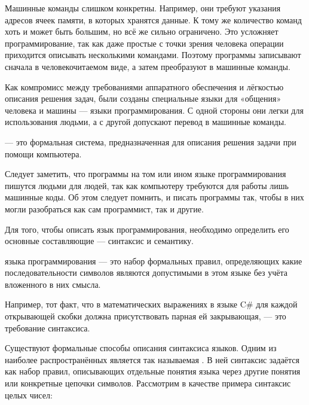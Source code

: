 Машинные команды слишком конкретны. Например, они требуют указания
адресов ячеек памяти, в которых хранятся данные. К тому же количество
команд хоть и может быть большим, но всё же сильно ограничено. Это
усложняет программирование, так как даже простые с точки зрения
человека операции приходится описывать несколькими командами. Поэтому
программы записывают сначала в человекочитаемом виде, а затем
преобразуют в машинные команды.

Как компромисс между требованиями аппаратного обеспечения и лёгкостью
описания решения задач, были созданы специальные языки для «общения»
человека и машины — языки программирования. С одной стороны они легки
для использования людьми, а с другой допускают перевод в машинные
команды.

\begin{defn}
   — это формальная
  система, предназначенная для описания решения задачи при помощи
  компьютера.
\end{defn}

Следует заметить, что программы на том или ином языке программирования
пишутся людьми для людей, так как компьютеру требуются для работы лишь
машинные коды. Об этом следует помнить, и писать программы так, чтобы
в них могли разобраться как сам программист, так и другие.


Для того, чтобы описать язык программирования, необходимо определить
его основные составляющие — синтаксис и семантику.

\begin{defn}
   языка программирования — это набор
  формальных правил, определяющих какие последовательности символов
  являются допустимыми в этом языке без учёта вложенного в них смысла.
\end{defn}

Например, тот факт, что в математических выражениях в языке C\# для
каждой открывающей скобки должна присутствовать парная ей
закрывающая, — это требование синтаксиса.


Существуют формальные способы описания синтаксиса языков. Одним из
наиболее распространённых является так называемая . В ней синтаксис задаётся как
набор правил, описывающих отдельные понятия языка через другие понятия
или конкретные цепочки символов. Рассмотрим в качестве примера
синтаксис целых чисел:


